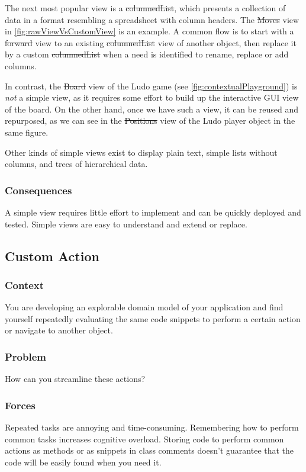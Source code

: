 \documentclass[sigconf]{acmart}
\begin{document}
The next most popular view is a \st{columnedList}, which presents a collection of data in a format resembling a spreadsheet with column headers.
The \st{Moves} view in \autoref{fig:rawViewVsCustomView} is an example.
A common flow is to start with a \st{forward} view to an existing \st{columnedList} view of another object, then replace it by a custom \st{columnedList} when a need is identified to rename, replace or add columns.

In contrast, the \st{Board} view of the Ludo game (see \autoref{fig:contextualPlayground}) is \emph{not} a simple view, as it requires some effort to build up the interactive GUI view of the board.
On the other hand, once we have such a view, it can be reused and repurposed, as we can see in the \st{Positions} view of the Ludo player object in the same figure.

Other kinds of simple views exist to display plain text, simple lists without columns, and trees of hierarchical data.

\subsubsection*{Consequences}
A simple view requires little effort to implement and can be quickly deployed and tested.
Simple views are easy to understand and extend or replace.

\subsection*{Custom Action}\label{pat:customAction}
\subsubsection*{Context}
You are developing an explorable domain model of your application and find yourself repeatedly evaluating the same code snippets to perform a certain action or navigate to another object.

\subsubsection*{Problem}
How can you streamline these actions?

\subsubsection*{Forces}
Repeated tasks are annoying and time-consuming.
Remembering how to perform common tasks increases cognitive overload.
Storing code to perform common actions as methods or as snippets in class comments doesn't guarantee that the code will be easily found when you need it.
\end{document}
